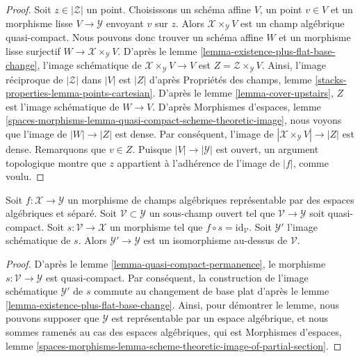 \begin{proof}
Soit $z \in |\mathcal{Z}|$ un point.
Choisissons un schéma affine $V$, un point $v \in V$ et un morphisme lisse
$V \to \mathcal{Y}$ envoyant $v$ sur $z$.
Alors $\mathcal{X} \times_\mathcal{Y} V$ est un champ algébrique quasi-compact.
Nous pouvons donc trouver un schéma affine $W$ et un morphisme lisse
surjectif $W \to \mathcal{X} \times_\mathcal{Y} V$.
D'après le lemme \ref{lemma-existence-plus-flat-base-change},
l'image schématique de
$\mathcal{X} \times_\mathcal{Y} V \to V$ est
$Z = \mathcal{Z} \times_\mathcal{Y} V$.
Ainsi, l'image réciproque de $|\mathcal{Z}|$ dans $|V|$ est $|Z|$ d'après
Propriétés des champs, lemme \ref{stacks-properties-lemma-points-cartesian}.
D'après le lemme \ref{lemma-cover-upstairs}, $Z$ est
l'image schématique de $W \to V$.
D'après Morphismes d'espaces, lemme
\ref{spaces-morphisms-lemma-quasi-compact-scheme-theoretic-image},
nous voyons que l'image de $|W| \to |Z|$ est dense.
Par conséquent, l'image de $|\mathcal{X} \times_\mathcal{Y} V| \to |Z|$
est dense. Remarquons que $v \in Z$.
Puisque $|V| \to |\mathcal{Y}|$ est ouvert, un argument topologique
montre que $z$ appartient à l'adhérence de l'image de $|f|$, comme voulu.
\end{proof}

\begin{lemma}
\label{lemma-scheme-theoretic-image-of-partial-section}
Soit $f : \mathcal{X} \to \mathcal{Y}$ un morphisme de champs algébriques
représentable par des espaces algébriques et séparé.
Soit $\mathcal{V} \subset \mathcal{Y}$ un sous-champ ouvert tel que
$\mathcal{V} \to \mathcal{Y}$ soit quasi-compact.
Soit $s : \mathcal{V} \to \mathcal{X}$ un morphisme tel que
$f \circ s = \text{id}_\mathcal{V}$.
Soit $\mathcal{Y}'$ l'image schématique de $s$.
Alors $\mathcal{Y}' \to \mathcal{Y}$ est un isomorphisme au-dessus de $\mathcal{V}$.
\end{lemma}

\begin{proof}
D'après le lemme \ref{lemma-quasi-compact-permanence},
le morphisme $s : \mathcal{V} \to \mathcal{Y}$ est quasi-compact.
Par conséquent, la construction de l'image schématique $\mathcal{Y}'$
de $s$ commute au changement de base plat d'après
le lemme \ref{lemma-existence-plus-flat-base-change}.
Ainsi, pour démontrer le lemme,
nous pouvons supposer que $\mathcal{Y}$ est représentable par un espace algébrique,
et nous sommes ramenés au cas des espaces algébriques, qui est
Morphismes d'espaces, lemme
\ref{spaces-morphisms-lemma-scheme-theoretic-image-of-partial-section}.
\end{proof}






